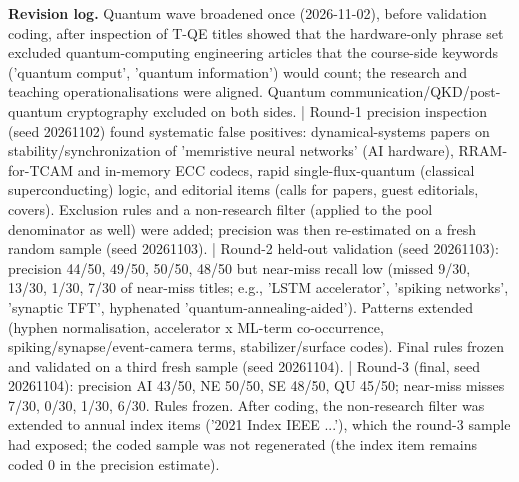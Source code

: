 \documentclass[10pt]{article}
\begin{document}
\noindent\textbf{Revision log.} Quantum wave broadened once (2026-11-02), before validation coding, after inspection of T-QE titles showed that the hardware-only phrase set excluded quantum-computing engineering articles that the course-side keywords ('quantum comput', 'quantum information') would count; the research and teaching operationalisations were aligned. Quantum communication/QKD/post-quantum cryptography excluded on both sides. | Round-1 precision inspection (seed 20261102) found systematic false positives: dynamical-systems papers on stability/synchronization of 'memristive neural networks' (AI hardware), RRAM-for-TCAM and in-memory ECC codecs, rapid single-flux-quantum (classical superconducting) logic, and editorial items (calls for papers, guest editorials, covers). Exclusion rules and a non-research filter (applied to the pool denominator as well) were added; precision was then re-estimated on a fresh random sample (seed 20261103). | Round-2 held-out validation (seed 20261103): precision 44/50, 49/50, 50/50, 48/50 but near-miss recall low (missed 9/30, 13/30, 1/30, 7/30 of near-miss titles; e.g., 'LSTM accelerator', 'spiking networks', 'synaptic TFT', hyphenated 'quantum-annealing-aided'). Patterns extended (hyphen normalisation, accelerator x ML-term co-occurrence, spiking/synapse/event-camera terms, stabilizer/surface codes). Final rules frozen and validated on a third fresh sample (seed 20261104). | Round-3 (final, seed 20261104): precision AI 43/50, NE 50/50, SE 48/50, QU 45/50; near-miss misses 7/30, 0/30, 1/30, 6/30. Rules frozen. After coding, the non-research filter was extended to annual index items ('2021 Index IEEE ...'), which the round-3 sample had exposed; the coded sample was not regenerated (the index item remains coded 0 in the precision estimate).
\end{document}
